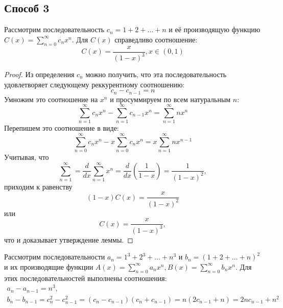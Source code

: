 \documentclass[11pt]{article}
\newcounter{lem}\setcounter{lem}{0}
\def\lm{\par\smallskip\refstepcounter{lem}\textbf{\arabic{lem}}}
\newtheorem*{Lemma}{Лемма \lm}
\newcounter{th}\setcounter{th}{0}
\begin{document}
\subsection{Способ 3}
\label{sec:org9b8bfd5}
\begin{Lemma}
Рассмотрим последовательность $c_n = 1 + 2 + \ldots + n$ и её производящую функцию $C(x) = \sum_{n = 0}^{\infty}c_nx^n$. Для $C(x)$ справедливо соотношение:
\begin{equation}
C(x) = \frac{x}{(1 - x)^3}, x \in (0, 1)
\end{equation}
\end{Lemma}
\begin{proof}
Из определения $c_n$ можно получить, что эта последовательность удовлетворяет следующему реккурентному соотношению:
\begin{equation*}
c_n - c_{n - 1} = n
\end{equation*}
Умножим это соотношение на $x^n$ и просуммируем по всем натуральным $n$:
\begin{equation*}
\sum_{n = 1}^{\infty}c_nx^n - \sum_{n = 1}^{\infty}c_{n - 1}x^n = \sum_{n = 1}^{\infty}nx^n
\end{equation*}
Перепишем это соотношение в виде:
\begin{equation*}
\sum_{n = 0}^{\infty}c_nx^n - x\sum_{n = 0}^{\infty}c_nx^n = x\sum_{n = 1}^{\infty}nx^{n - 1}
\end{equation*}
Учитывая, что
\begin{equation*}
\sum_{n = 1}^{\infty} = \frac{d}{dx}\sum_{n = 1}^{\infty}x^n = \frac{d}{dx}\left(\frac1{1 - x}\right) = \frac1{(1 - x)^2},
\end{equation*}
приходим к равенству
\begin{equation*}
(1 - x)C(x) = \frac{x}{(1 - x)^2}
\end{equation*}
или
\begin{equation*}
C(x) = \frac{x}{(1 - x)^3},
\end{equation*}
что и доказывает утверждение леммы.
\end{proof}
Рассмотрим последовательности \(a_n = 1^3 + 2^3 + \ldots + n^3\) и \(b_n = (1 + 2 + \ldots + 
n)^2\) и их производящие функции \(A(x) = \sum_{n = 0}^{\infty}a_nx^n, B(x) = \sum_{n = 0}^{\infty}b_nx^n\). Для этих последовательностей выполнены соотношения:
\begin{gather*}
a_n - a_{n - 1} = n^3, \\
b_n - b_{n - 1} = c^2_n - c^2_{n - 1} = (c_n - c_{n - 1})(c_n + c_{n - 1}) = n(2c_{n - 1} + n) = 2nc_{n - 1} + n^2
\end{gather*}
\end{document}

